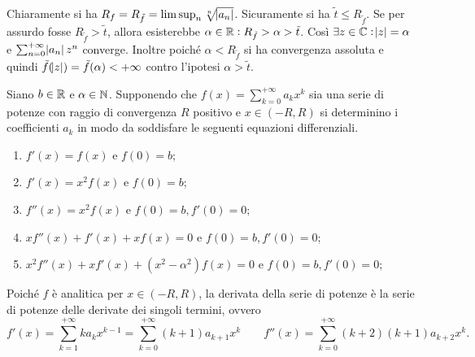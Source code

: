\documentclass[a4paper]{article}\par \usepackage{style}\par
\begin{document}
Chiaramente si ha $ R_f = R_{\tilde{f}} = \limsup_n \sqrt[n]{\abs{a_n}} $. Sicuramente si ha $ \tilde{t} \leq R_{\tilde{f}} $. Se per assurdo fosse $ R_{\tilde{f}} > \tilde{t} $, allora esisterebbe $ \alpha \in \mathbb{R} : R_{\tilde{f}} > \alpha > \tilde{t} $. Così $ \exists z \in \mathbb{C} : \abs{z} = \alpha $ e $ \sum_{n = 0}^{+\infty} \abs{a_n} z^n $ converge. Inoltre poiché $ \alpha < R_{\tilde{f}} $ si ha convergenza assoluta e quindi $ \tilde{f}(\abs{z}) = \tilde{f}(\alpha) < +\infty $ contro l'ipotesi $ \alpha > \tilde{t} $.\par \begin{es}
  Siano $ b \in \mathbb{R} $ e $ \alpha \in \mathbb{N} $. Supponendo che $ f(x) = \sum_{k = 0}^{+\infty} a_k x^k  $ sia una serie di potenze con raggio di convergenza $ R $ positivo e $ x \in (-R, R) $ si determinino i coefficienti $ a_k $ in modo da soddisfare le seguenti equazioni differenziali.
  \begin{enumerate}[label = (\roman*)]
  \item $ f'(x) = f(x) $ e $ f(0) = b $;
  \item $ f'(x) = x^2 f(x) $ e $ f(0) = b $;
  \item $ f''(x) = x^2 f(x) $ e $ f(0) = b, f'(0) = 0 $;
  \item $ x f''(x) + f'(x) + x f(x) = 0 $ e $ f(0) = b, f'(0) = 0 $;
  \item $ x^2 f''(x) + x f'(x) + (x^2 - \alpha^2) f(x) = 0 $ e $ f(0) = b, f'(0) = 0 $;
  \end{enumerate}
\end{es}\par Poiché $ f $ è analitica per $ x \in (-R, R) $, la derivata della serie di potenze è la serie di potenze delle derivate dei singoli termini, ovvero \[f'(x) = \sum_{k = 1}^{+\infty} k a_k x^{k - 1} = \sum_{k = 0}^{+\infty} (k + 1) a_{k + 1} x^k \qquad f''(x) = \sum_{k = 0}^{+\infty} (k + 2)(k + 1) a_{k + 2} x^k.\]
\end{document}
